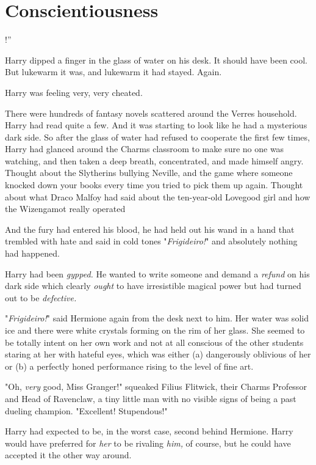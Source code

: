 \chapter{Conscientiousness}

!''

Harry dipped a finger in the glass of water on his desk. It should have been
cool. But lukewarm it was, and lukewarm it had stayed. Again.

Harry was feeling very, very cheated.

There were hundreds of fantasy novels scattered around the Verres household.
Harry had read quite a few. And it was starting to look like he had a
mysterious dark side. So after the glass of water had refused to cooperate the
first few times, Harry had glanced around the Charms classroom to make sure no
one was watching, and then taken a deep breath, concentrated, and made himself
angry. Thought about the Slytherins bullying Neville, and the game where
someone knocked down your books every time you tried to pick them up again.
Thought about what Draco Malfoy had said about the ten-year-old Lovegood girl
and how the Wizengamot really operated{\el}

And the fury had entered his blood, he had held out his wand in a hand that
trembled with hate and said in cold tones "\emph{Frigideiro!}" and absolutely
nothing had happened.

Harry had been \emph{gypped.} He wanted to write someone and demand a
\emph{refund} on his dark side which clearly \emph{ought} to have irresistible
magical power but had turned out to be \emph{defective.}

"\emph{Frigideiro!}" said Hermione again from the desk next to him. Her water
was solid ice and there were white crystals forming on the rim of her glass.
She seemed to be totally intent on her own work and not at all conscious of the
other students staring at her with hateful eyes, which was either (a)
dangerously oblivious of her or (b) a perfectly honed performance rising to the
level of fine art.

"Oh, \emph{very} good, Miss Granger!" squeaked Filius Flitwick, their Charms
Professor and Head of Ravenclaw, a tiny little man with no visible signs of
being a past dueling champion. "Excellent! Stupendous!"

Harry had expected to be, in the worst case, second behind Hermione. Harry
would have preferred for \emph{her} to be rivaling \emph{him,} of course, but
he could have accepted it the other way around.

